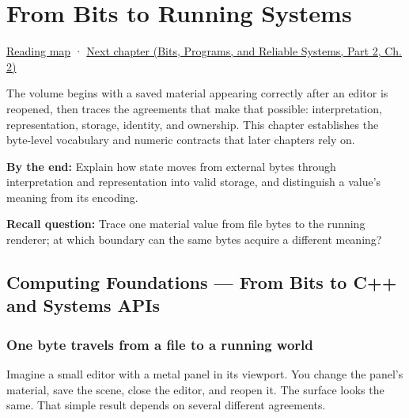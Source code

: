 \chapter{From Bits to Running Systems}\label{01-foundations-i-ch001-from-bits-to-running-systems}\hypertarget{01-foundations-i-ch001}{}\label{stagechapter:01-foundations-i-ch001}

\hypertarget{01-foundations-i-ch001-from-bits-to-running-systems}{}

\hyperref[volume-reading-map]{Reading map} · \href{../01-Bits-Programs-and-Reliable-Systems-P02/main.pdf\#01-foundations-i-ch002-values-at-addresses-layout-lifetimes-and-representation}{Next chapter (Bits, Programs, and Reliable Systems, Part 2, Ch. 2)}

The volume begins with a saved material appearing correctly after an editor is reopened, then traces the agreements that make that possible: interpretation, representation, storage, identity, and ownership. This chapter establishes the byte-level vocabulary and numeric contracts that later chapters rely on.

\textbf{By the end:} Explain how state moves from external bytes through interpretation and representation into valid storage, and distinguish a value's meaning from its encoding.

\textbf{Recall question:} Trace one material value from file bytes to the running renderer; at which boundary can the same bytes acquire a different meaning?

\section{Computing Foundations --- From Bits to C++ and Systems APIs}\label{01-foundations-i-ch001-computing-foundations-from-bits-to-c-and-systems-apis}

\hypertarget{01-foundations-i-ch001-computing-foundations-from-bits-to-c-and-systems-apis}{}

\subsection{One byte travels from a file to a running world}\label{01-foundations-i-ch001-one-byte-travels-from-a-file-to-a-running-world}

\hypertarget{01-foundations-i-ch001-one-byte-travels-from-a-file-to-a-running-world}{}

Imagine a small editor with a metal panel in its viewport. You change the panel's material, save the scene, close the editor, and reopen it. The surface looks the same. That simple result depends on several different agreements.

